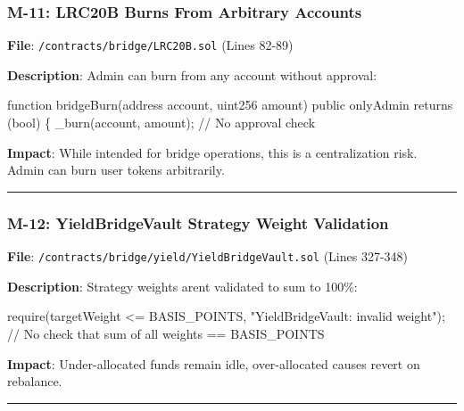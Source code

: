 \documentclass[
]{article}
\newenvironment{Shaded}{}{}
\newcommand{\NormalTok}[1]{#1}
\begin{document}
\subsubsection{M-11: LRC20B Burns From Arbitrary
Accounts}\label{m-11-lrc20b-burns-from-arbitrary-accounts}

\textbf{File}: \texttt{/contracts/bridge/LRC20B.sol} (Lines 82-89)

\textbf{Description}: Admin can burn from any account without approval:

\begin{Shaded}
\begin{Highlighting}[]
\NormalTok{function bridgeBurn(address account, uint256 amount) public onlyAdmin returns (bool) \{}
\NormalTok{    \_burn(account, amount);  // No approval check}
\end{Highlighting}
\end{Shaded}

\textbf{Impact}: While intended for bridge operations, this is a
centralization risk. Admin can burn user tokens arbitrarily.

\begin{center}\rule{0.5\linewidth}{0.5pt}\end{center}

\subsubsection{M-12: YieldBridgeVault Strategy Weight
Validation}\label{m-12-yieldbridgevault-strategy-weight-validation}

\textbf{File}: \texttt{/contracts/bridge/yield/YieldBridgeVault.sol}
(Lines 327-348)

\textbf{Description}: Strategy weights aren\textquotesingle t validated
to sum to 100\%:

\begin{Shaded}
\begin{Highlighting}[]
\NormalTok{require(targetWeight \textless{}= BASIS\_POINTS, "YieldBridgeVault: invalid weight");}
\NormalTok{// No check that sum of all weights == BASIS\_POINTS}
\end{Highlighting}
\end{Shaded}

\textbf{Impact}: Under-allocated funds remain idle, over-allocated
causes revert on rebalance.

\begin{center}\rule{0.5\linewidth}{0.5pt}\end{center}
\end{document}
